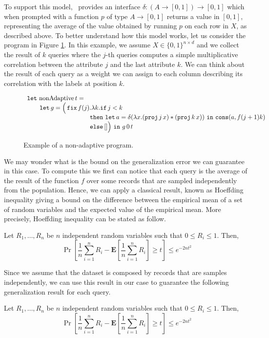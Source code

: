 \documentclass[acmsmall,review,anonymous]{acmart}\settopmatter{printfolios=true,printccs=false,printacmref=false}
\begin{document}
To support this model, \THESYSTEM\ provides an interface
$\delta:(A\to[0,1])\to [0,1]$ which when prompted with a function $p$ of
type $A\to[0,1]$ returns a value in $[0,1]$, representing the average
of the value obtained by running $p$ on each row in $X$, as described above. To better understand how this model works, let us
consider the program in Figure \ref{fig:nonadaptive}. In this example,
we assume $X\in\{0,1\}^{n\times d}$ and we collect the result of
$k$ queries where the $j$-th queries computes a simple multiplicative correlation between
the attribute $j$ and the last attribute $k$. We can think about the
result of each query as a weight we can assign to each column
describing its correlation with the labels at position $k$.

\begin{figure}
  \centering
  $$
  \begin{array}{l}
    \mathop{\mathtt{let}}\, \mathrm{nonAdaptive}\, t = \\
\qquad \mathop{\mathtt{let}} g = \Big (\mathop{\mathtt{fix}} f(j).\lambda k.
	\mathtt{if}\,  j < k\, \\
\qquad \qquad \qquad\qquad  \qquad \mathtt{then}\,  \mathop{\mathtt{let}} a = \delta(\lambda
    x. ({\tt proj}\, j \, x) * ({\tt proj}\, k\, x))\, 
	\mathop{ \mathtt{in}}\, 
	\mathop{\mathtt{cons}}(a, f (j +1) k)\\
\qquad \qquad \qquad\qquad \qquad \mathtt{else}\, [] \Big )\, \mathop{ \mathtt{in}}\, g\, 0\, t\\
  \end{array}
  $$
  \caption{Example of a non-adaptive program.}
  \label{fig:nonadaptive}
\end{figure}

We may wonder what is the bound on the generalization error we can
guarantee in this case. To compute this we first can notice that each
query is the average of the result of the function $f$ over some
records that are sampled independently from the population. Hence, 
we can apply a classical result, known as Hoeffding inequality giving
a bound on the difference between the empirical mean of a set of
random variables and the expected value of the empirical mean. More
precisely, Hoeffding inequality can be stated as follow.
\begin{theorem}
Let $R_1,\ldots,R_n$ be $n$ independent random variables such that
$0 \leq R_i\leq 1$. Then, 
$$
\Pr[\frac{1}{n}\sum_{i=1}^n R_i- \mathbf{E}[\frac{1}{n}\sum_{i=1}^n
R_i]\geq t]\leq e^{-2nt^2}
$$
\end{theorem}

Since we assume that the dataset is composed by records that are
samples independently, we can use this result in our case to guarantee
the following generalization result for each query.
\begin{proposition}
Let $R_1,\ldots,R_n$ be $n$ independent random variables such that
$0 \leq R_i\leq 1$. Then, 
$$
\Pr[\frac{1}{n}\sum_{i=1}^n R_i- \mathbf{E}[\frac{1}{n}\sum_{i=1}^n
R_i]\geq t]\leq e^{-2nt^2}
$$
\end{proposition}
\end{document}
